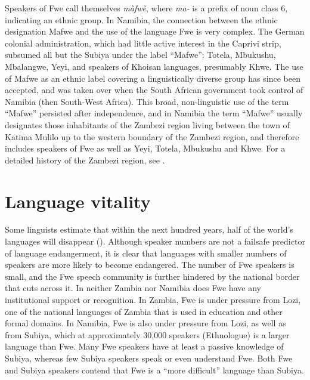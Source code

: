 Speakers of Fwe call themselves \textit{màfwè}, where \textit{ma-} is a prefix of noun class 6, indicating an ethnic group. In Namibia, the connection between the ethnic designation Mafwe and the use of the language Fwe is very complex. The German colonial administration, which had little active interest in the Caprivi strip, subsumed all but the Subiya under the label “Mafwe”: Totela, Mbukushu, Mbalangwe, Yeyi, and speakers of Khoisan languages, presumably Khwe. The use of Mafwe as an ethnic label covering a linguistically diverse group has since been accepted, and was taken over when the South African government took control of Namibia (then South-West Africa). This broad, non-linguistic use of the term “Mafwe” persisted after independence, and in Namibia the term “Mafwe” usually designates those inhabitants of the Zambezi region living between the town of Katima Mulilo up to the western boundary of the Zambezi region, and therefore includes speakers of Fwe as well as Yeyi, Totela, Mbukushu and Khwe. For a detailed history of the Zambezi region, see {\citet{Kangumu2011}}.

\section{Language vitality}
\label{bkm:Ref450562376}\hypertarget{Toc75352596}{}
Some linguists estimate that within the next hundred years, half of the world’s languages will disappear (\citealt{AustinSallabank2011}). Although speaker numbers are not a failsafe predictor of language endangerment, it is clear that languages with smaller numbers of speakers are more likely to become endangered. The number of Fwe speakers is small, and the Fwe speech community is further hindered by the national border that cuts across it. In neither Zambia nor Namibia does Fwe have any institutional support or recognition. In Zambia, Fwe is under pressure from Lozi, one of the national languages of Zambia that is used in education and other formal domains. In Namibia, Fwe is also under pressure from Lozi, as well as from Subiya, which at approximately 30,000 speakers (Ethnologue) is a larger language than Fwe. Many Fwe speakers have at least a passive knowledge of Subiya, whereas few Subiya speakers speak or even understand Fwe. Both Fwe and Subiya speakers contend that Fwe is a “more difficult” language than Subiya.

